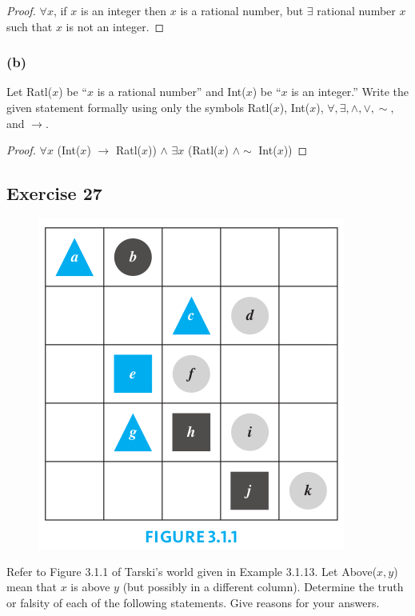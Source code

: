 \documentclass[14pt]{extarticle}
\newcommand{\fa}{\forall}
\newcommand{\te}{\exists}
\begin{document}
\begin{proof}
$\fa x$, if $x$ is an integer then $x$ is a rational number, but $\te$ rational number $x$ such that $x$ is not an integer.
\end{proof}

\subsubsection{(b)}
Let Ratl($x$) be “$x$ is a rational number” and Int($x$) be “$x$ is an integer.” Write the given statement formally using only the symbols Ratl($x$), Int($x$), $\fa, \te, \wedge, \vee, \sim,$ and $\to$.

\begin{proof}
$\fa x$ (Int($x$) $\to$ Ratl($x$)) $\wedge$ $\te x$ (Ratl($x$) $\wedge \sim$ Int($x$))
\end{proof}

\subsection{Exercise 27}
\begin{figure}[ht!]
\centering
\includegraphics[scale=0.4]{../images/3.1.1.png}
\end{figure}

Refer to Figure 3.1.1 of Tarski’s world given in Example 3.1.13. Let Above($x, y$) mean that $x$ is above $y$ (but possibly in a different column). Determine the truth or falsity of each of the following statements. Give reasons for your answers.
\end{document}
